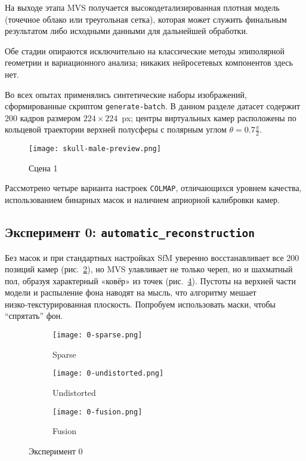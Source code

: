 \begin{enumerate}
  На выходе этапа MVS получается высокодетализированная
  плотная модель (точечное облако или треугольная сетка), которая
  может служить финальным результатом либо исходными данными для
  дальнейшей обработки.
\end{enumerate}

\noindent Обе стадии опираются исключительно на классические методы эпиполярной геометрии
и вариационного анализа; никаких нейросетевых компонентов здесь нет.

Во всех опытах применялись синтетические наборы изображений, сформированные
скриптом \texttt{generate-batch}. В данном разделе датасет содержит 200
кадров размером $224\times224$~px; центры виртуальных камер расположены по
кольцевой траектории верхней полусферы с полярным углом $\theta = 0.7\frac{\pi}{2}$.

\begin{figure}[h]
    \centering
    \texttt{[image: skull-male-preview.png]}
    \caption{Сцена 1}
    \label{fig:scene1}
\end{figure}

Рассмотрено четыре варианта настроек \texttt{COLMAP}, отличающихся уровнем
качества, использованием бинарных масок и наличием априорной калибровки камер.

\subsection{Эксперимент 0: \texttt{automatic\_reconstruction}}

Без масок и при стандартных настройках SfM уверенно восстанавливает все 200
позиций камер (рис.~\ref{fig:0sparse}), но MVS улавливает не только череп, но и
шахматный пол, образуя характерный «ковёр» из точек (рис.~\ref{fig:0fusion}).
Пустоты на верхней части модели и распыление фона наводят на мысль, что
алгоритму мешает низко‑текстурированная плоскость. Попробуем использовать маски,
чтобы ``спрятать'' фон.

\begin{figure}[h]
    \centering
    \begin{subfigure}[b]{0.3\textwidth}
        \texttt{[image: 0-sparse.png]}
        \caption{Sparse}
        \label{fig:0sparse}
    \end{subfigure}
    \hfill
    \begin{subfigure}[b]{0.3\textwidth}
        \texttt{[image: 0-undistorted.png]}
        \caption{Undistorted}
        \label{fig:0undistorted}
    \end{subfigure}
    \hfill
    \begin{subfigure}[b]{0.3\textwidth}
        \texttt{[image: 0-fusion.png]}
        \caption{Fusion}
        \label{fig:0fusion}
    \end{subfigure}
    \caption{Эксперимент 0}
    \label{fig:0exp}
\end{figure}

